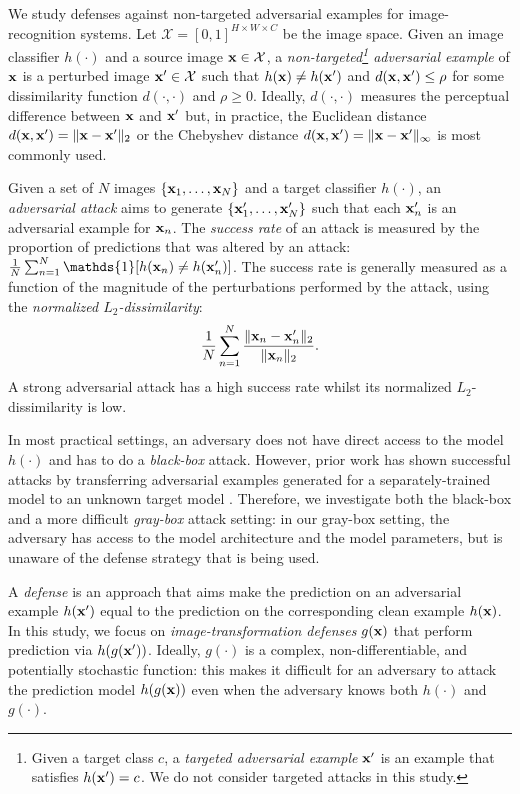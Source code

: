 
We study defenses against non-targeted adversarial examples for image-recognition systems. Let $\mathcal{X} = [0,1]^{H \times W \times C}$ be the image space. Given an image classifier
$h(\cdot)$ and a source image $\mathbf{x} \in \mathcal{X}$, a \emph{non-targeted\footnote{Given a target class $c$, a \emph{targeted adversarial example} $\mathbf{x}'$ is an example that satisfies $h(\mathbf{x}') = c$. We do not consider targeted attacks in this study.} adversarial example} of
$\mathbf{x}$ is a perturbed image $\mathbf{x}' \in \mathcal{X}$ such that $h(\mathbf{x}) \neq h(\mathbf{x}')$ and
$d(\mathbf{x}, \mathbf{x}') \leq \rho$ for some dissimilarity function $d(\cdot, \cdot)$ and $\rho \geq 0$. Ideally, $d(\cdot, \cdot)$ measures the perceptual difference between $\mathbf{x}$ and $\mathbf{x}'$ but, in practice, the Euclidean distance $d(\mathbf{x}, \mathbf{x}') = \| \mathbf{x} - \mathbf{x}' \|_2$ or the Chebyshev distance
$d(\mathbf{x}, \mathbf{x}') = \| \mathbf{x} - \mathbf{x}' \|_\infty$ is most commonly used.

Given a set of $N$ images $\{\mathbf{x}_1,\ldots,\mathbf{x}_N\}$ and a target classifier $h(\cdot)$, an
\emph{adversarial attack} aims to generate $\{\mathbf{x}_1',\ldots,\mathbf{x}_N'\}$ such that each $\mathbf{x}_n'$
is an adversarial example for $\mathbf{x}_n$. The \emph{success rate} of an attack is measured by the proportion of predictions that was altered by an attack: $\frac{1}{N} \sum_{n=1}^N \mathds{1}[h(\bx_n) \neq h(\bx_n')]$. The success rate is generally measured as a function of the magnitude of the perturbations performed by the attack, using the \emph{normalized $L_2$-dissimilarity}:
\begin{equation}
\label{l2-dissim}
\frac{1}{N} \sum_{n=1}^N \frac{\| \mathbf{x}_n - \mathbf{x}_n' \|_2}{\| \mathbf{x}_n \|_2}.
\end{equation}
A strong adversarial attack has a high success rate whilst its normalized $L_2$-dissimilarity is low.

In most practical settings, an adversary does not have direct access to the model $h(\cdot)$ and has to do a \emph{black-box} attack. However, prior work has shown successful attacks by transferring adversarial examples generated for a separately-trained model to an unknown target model \citep{liu2016delving}. Therefore, we investigate both the black-box and a more difficult \emph{gray-box} attack setting: in our gray-box setting, the adversary has access to the model architecture and the model parameters, but is unaware of the defense strategy that is being used.

A \emph{defense} is an approach that aims make the prediction on an adversarial example $h(\mathbf{x}')$ equal to the prediction on the corresponding clean example $h(\mathbf{x})$. In this study, we focus on \emph{image-transformation defenses} $g(\mathbf{x})$ that perform prediction via $h(g(\mathbf{x}'))$. Ideally, $g(\cdot)$ is a complex, non-differentiable, and potentially stochastic function: this makes it difficult for an adversary to attack the prediction model $h(g(\mathbf{x}))$ even when the adversary knows both $h(\cdot)$ and $g(\cdot)$.
